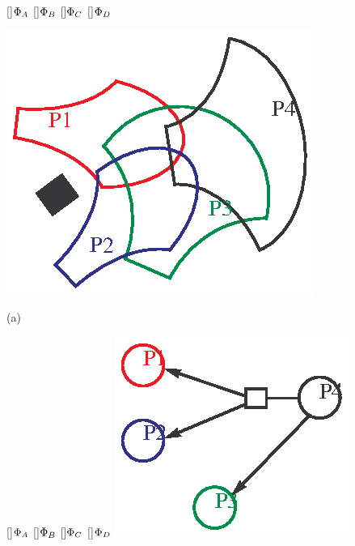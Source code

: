 \begin{figure}[bt]
  \centering 
\begin{minipage}{0.45\linewidth}
  \centering 
{}[]{\textcolor{red}{$\Phi_A$}}
[]{\textcolor{blue}{$\Phi_B$}}
[]{\textcolor{DarkGreen}{$\Phi_C$}}
[]{$\Phi_D$}

  \includegraphics[width=\linewidth]{graphics/nondeter2D.eps} 

{\footnotesize (a)}
\end{minipage}
\hspace{0.05\linewidth}
\begin{minipage}{0.45\linewidth}
  \centering 
{}[]{\textcolor{red}{$\Phi_A$}}
[]{\textcolor{blue}{$\Phi_B$}}
[]{\textcolor{DarkGreen}{$\Phi_C$}}
[]{$\Phi_D$}
  \includegraphics[width=\linewidth]{graphics/nondeterGraph.eps} 


\end{minipage}
\end{figure}

